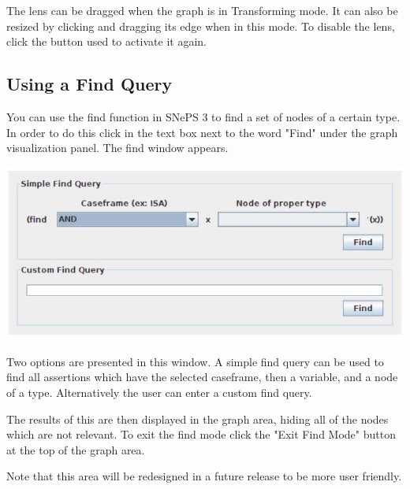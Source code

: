 \documentclass[10pt]{article}
\begin{document}
The lens can be dragged when the graph is in Transforming mode. It can also be resized by clicking and dragging its edge when in this mode. To disable the lens, click the button used to activate it again.

\subsection{Using a Find Query}
You can use the find function in SNePS 3 to find a set of nodes of a certain type. In order to do this click in the text box next to the word "Find" under the graph visualization panel. The find window appears.

\begin{center}
\includegraphics[max width=\textwidth]{2023_06_06_402e2c8ca4c84733095bg-7}
\end{center}

Two options are presented in this window. A simple find query can be used to find all assertions which have the selected caseframe, then a variable, and a node of a type. Alternatively the user can enter a custom find query.

The results of this are then displayed in the graph area, hiding all of the nodes which are not relevant. To exit the find mode click the "Exit Find Mode" button at the top of the graph area.

Note that this area will be redesigned in a future release to be more user friendly.
\end{document}
